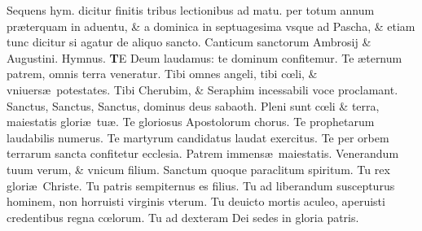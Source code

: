 \documentclass[a5paper,10pt]{book}
\def\ae{æ}
\def\oe{œ}
\begin{document}
\begin{multicols*}{2}
\newline {} \color{red} Sequens hym. dicitur %
finitis tribus lectionibus ad matu. per totum annum pr\ae terquam in aduentu, \& a dominica in septuagesima vsque ad Pascha, \& etiam tunc dicitur si agatur de aliquo sancto. \color{black}
\newline {} \color{red} Canticum sanctorum Ambrosij \& Augustini. \hypertarget{tedeum}{Hymnus.} \color{black}
\vspace{-1em}
\lettrine[lines=2]{\bfseries \color{red} T}{}E Deum laudamus: te dominum confitemur.
\newline \color{red} T\color{black}e \ae ternum patrem, omnis terra veneratur.
\newline \color{red} T\color{black}ibi omnes angeli, tibi c\oe li, \& vniuers\ae \ potestates.
\newline \color{red} T\color{black}ibi Cherubim, \& Seraphim incessabili voce proclamant.
\newline \color{red} S\color{black}anctus, Sanctus, Sanctus, dominus deus sabaoth.
\newline \color{red} P\color{black}leni sunt c\oe li \& terra, maiestatis glori\ae \ tu\ae .
\newline \color{red} T\color{black}e gloriosus Apostolorum chorus.
\newline \color{red} T\color{black}e prophetarum laudabilis numerus.
\newline \color{red} T\color{black}e martyrum candidatus laudat exercitus.
\newline \color{red} T\color{black}e per orbem terrarum sancta confitetur ecclesia.
\newline \color{red} P\color{black}atrem immens\ae \ maiestatis.
\newline \color{red} V\color{black}enerandum tuum verum, \& vnicum filium.
\newline \color{red} S\color{black}anctum quoque paraclitum spiritum.
\newline \color{red} T\color{black}u rex glori\ae \ Christe.
\newline \color{red} T\color{black}u patris sempiternus es filius.
\newline \color{red} T\color{black}u ad liberandum suscepturus hominem, non horruisti virginis vterum.
\newline \color{red} T\color{black}u deuicto mortis aculeo, aperuisti credentibus regna c\oe lorum.
\newline \color{red} T\color{black}u ad dexteram Dei sedes in gloria patris.

\end{multicols*}
\end{document}
